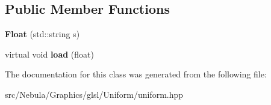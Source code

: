 \subsection*{\-Public \-Member \-Functions}
\begin{DoxyCompactItemize}
\item 
\hypertarget{classNeb_1_1glsl_1_1Uniform_1_1Scalar_1_1Float_a98cbc3f3264a8c007ae4bc942a0e552a}{{\bfseries \-Float} (std\-::string s)}\label{classNeb_1_1glsl_1_1Uniform_1_1Scalar_1_1Float_a98cbc3f3264a8c007ae4bc942a0e552a}

\item 
\hypertarget{classNeb_1_1glsl_1_1Uniform_1_1Scalar_1_1Float_abd103084c29a30e932404f83dfdf6c62}{virtual void {\bfseries load} (float)}\label{classNeb_1_1glsl_1_1Uniform_1_1Scalar_1_1Float_abd103084c29a30e932404f83dfdf6c62}

\end{DoxyCompactItemize}


\-The documentation for this class was generated from the following file\-:\begin{DoxyCompactItemize}
\item 
src/\-Nebula/\-Graphics/glsl/\-Uniform/uniform.\-hpp\end{DoxyCompactItemize}
